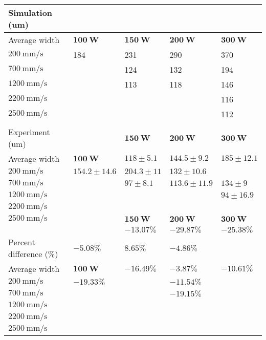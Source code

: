 \documentclass[10pt]{article}
\begin{document}
\begin{center}
\begin{tabular}{lllll}
\hline
Simulation (um) &  &  &  &  \\
\hline
Average width & $\mathbf{1 0 0} \mathbf{~ W}$ & $\mathbf{1 5 0} \mathbf{~ W}$ & $\mathbf{2 0 0} \mathbf{~ W}$ & $\mathbf{3 0 0} \mathbf{~ W}$ \\
\hline
$200 \mathrm{~mm} / \mathrm{s}$ & 184 & 231 & 290 & 370 \\
$700 \mathrm{~mm} / \mathrm{s}$ &  & 124 & 132 & 194 \\
$1200 \mathrm{~mm} / \mathrm{s}$ &  & 113 & 118 & 146 \\
$2200 \mathrm{~mm} / \mathrm{s}$ &  &  &  & 116 \\
$2500 \mathrm{~mm} / \mathrm{s}$ &  &  &  & 112 \\
 &  &  &  &  \\
Experiment (um) &  & $\mathbf{1 5 0} \mathbf{~ W}$ & $\mathbf{2 0 0} \mathbf{~ W}$ & $\mathbf{3 0 0} \mathbf{~ W}$ \\
Average width & $\mathbf{1 0 0} \mathbf{~ W}$ & $118 \pm 5.1$ & $144.5 \pm 9.2$ & $185 \pm 12.1$ \\
$200 \mathrm{~mm} / \mathrm{s}$ & $154.2 \pm 14.6$ & $204.3 \pm 11$ & $132 \pm 10.6$ &  \\
$700 \mathrm{~mm} / \mathrm{s}$ &  & $97 \pm 8.1$ & $113.6 \pm 11.9$ & $134 \pm 9$ \\
$1200 \mathrm{~mm} / \mathrm{s}$ &  &  &  & $94 \pm 16.9$ \\
$2200 \mathrm{~mm} / \mathrm{s}$ &  &  &  &  \\
$2500 \mathrm{~mm} / \mathrm{s}$ &  & $\mathbf{1 5 0} \mathbf{~ W}$ & $\mathbf{2 0 0} \mathbf{~ W}$ & $\mathbf{3 0 0} \mathbf{~ W}$ \\
 &  & $-13.07 \%$ & $-29.87 \%$ & $-25.38 \%$ \\
Percent difference (\%) & $-5.08 \%$ & $8.65 \%$ & $-4.86 \%$ &  \\
Average width & $\mathbf{1 0 0} \mathbf{~ W}$ & $-16.49 \%$ & $-3.87 \%$ & $-10.61 \%$ \\
$200 \mathrm{~mm} / \mathrm{s}$ & $-19.33 \%$ &  & $-11.54 \%$ &  \\
$700 \mathrm{~mm} / \mathrm{s}$ &  &  & $-19.15 \%$ &  \\
$1200 \mathrm{~mm} / \mathrm{s}$ &  &  &  &  \\
$2200 \mathrm{~mm} / \mathrm{s}$ &  &  &  &  \\
$2500 \mathrm{~mm} / \mathrm{s}$ &  &  &  &  \\
\hline
\end{tabular}
\end{center}
\end{document}
